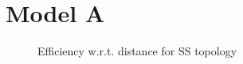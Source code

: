 \section{Model A}

\begin{figure}[h]
\centering
\begin{subfigmatrix}{2} 
\end{subfigmatrix}
\end{figure}
\begin{figure}[H]
\centering
\begin{subfigmatrix}{1} 
\end{subfigmatrix}
\caption{Efficiency w.r.t. distance for SS topology}
\end{figure}

